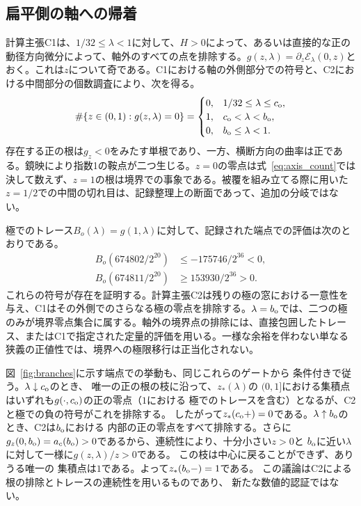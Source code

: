 \subsection{扁平側の軸への帰着}
計算主張C1は、$1/32\le\lambda<1$に対して、$H>0$によって、あるいは直接的な正の動径方向微分によって、軸外のすべての点を排除する。$g(z,\lambda)=\partial_z\mathcal E_\lambda(0,z)$とおく。これは$z$について奇である。C1における軸の外側部分での符号と、C2における中間部分の個数調査により、次を得る。
\begin{equation}\label{eq:axis_count}
 \#\{z\in(0,1):g(z,\lambda)=0\}
 =\begin{cases}
 0,&1/32\le\lambda\le c_{\mathrm o},\\
 1,&c_{\mathrm o}<\lambda<b_{\mathrm o},\\
 0,&b_{\mathrm o}\le\lambda<1.
 \end{cases}
\end{equation}
存在する正の根は$g_z<0$をみたす単根であり、一方、横断方向の曲率は正である。鏡映により指数1の鞍点が二つ生じる。$z=0$の零点は式~\eqref{eq:axis_count}では決して数えず、$z=1$の根は境界での事象である。被覆を組み立てる際に用いた$z=1/2$での中間の切れ目は、記録整理上の断面であって、追加の分岐ではない。

極でのトレース$B_o(\lambda)=g(1,\lambda)$に対して、記録された端点での評価は次のとおりである。
\begin{align}\label{eq:oblate_endpoint}
 B_o(674802/2^{20})&\le-175746/2^{36}<0,\\
 B_o(674811/2^{20})&\ge153930/2^{36}>0.\nonumber
\end{align}
これらの符号が存在を証明する。計算主張C2は残りの極の窓における一意性を与え、C1はその外側でのさらなる極の零点を排除する。$\lambda=b_{\mathrm o}$では、二つの極のみが境界零点集合に属する。軸外の境界点の排除には、直接包囲したトレース、またはC1で指定された定量的評価を用いる。一様な余裕を伴わない単なる狭義の正値性では、境界への極限移行は正当化されない。

図~\ref{fig:branches}に示す端点での挙動も、同じこれらのゲートから
条件付きで従う。$\lambda\downarrow c_{\mathrm o}$のとき、
唯一の正の根の枝に沿って、$z_*(\lambda)$の
$(0,1]$における集積点はいずれも$g(\cdot,c_{\mathrm o})$の正の零点（$1$における
極でのトレースを含む）となるが、C2と極での負の符号がこれを排除する。
したがって$z_*(c_{\mathrm o}+)=0$である。$\lambda\uparrow b_{\mathrm o}$のとき、C2は$b_{\mathrm o}$における
内部の正の零点をすべて排除する。さらに
$g_z(0,b_{\mathrm o})=a_c(b_{\mathrm o})>0$であるから、連続性により、十分小さい$z>0$と
$b_{\mathrm o}$に近い$\lambda$に対して一様に$g(z,\lambda)/z>0$である。
この枝は中心に戻ることができず、ありうる唯一の
集積点は$1$である。よって$z_*(b_{\mathrm o}-)=1$である。
この議論はC2による根の排除とトレースの連続性を用いるものであり、
新たな数値的認証ではない。

